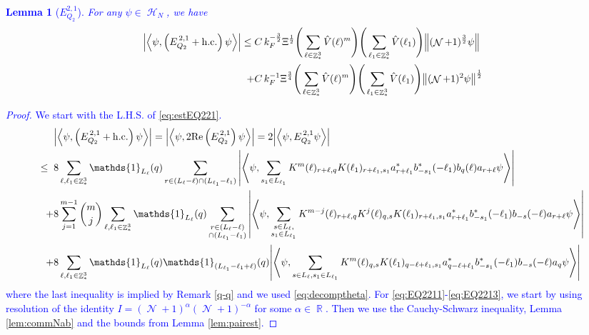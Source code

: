 \documentclass[sn-mathphys, Numbered ,a4paper]{sn-jnl}%
\DeclareMathOperator{\R}{\mathbb{R}}
\DeclareMathOperator{\Z}{\mathbb{Z}}
\DeclareMathOperator{\HH}{\mathcal{H}}
\DeclareMathOperator{\NN}{\mathcal{N}}
\newcommand{\half}{\frac{1}{2}}
\newcommand{\eva}[1]{\left\langle #1 \right\rangle}
\theoremstyle{plain}
\newtheorem{lemma}[theorem]{Lemma}
\theoremstyle{definition}
\theoremstyle{remark}
\theoremstyle{plain}
\theoremstyle{definition}
\theoremstyle{remark}
\begin{document}
\textcolor{blue}{\begin{lemma}[$E_{Q_2}^{2,1}$]\label{lem:EQ221}
    For any $\psi \in \HH_N$, we have
    \begin{alignat}{2}
    	\abs{\eva{\psi,\left(E^{\,2,1}_{Q_2}+\mathrm{h.c.}\right) \psi }}
    	\leq \; &C\,  k_{F}^{-\frac{3}{2}} \Xi^\half \Bigg(\sum\limits_{\ell \in \Z^3_*} \hat{V}(\ell)^m\Bigg)\Bigg( \sum\limits_{\ell_1 \in \Z^3_*} \hat{V}(\ell_1) \Bigg) \norm { (\NN+1)^{\frac{3}{2}} \psi }\\
    	\;+ &C\, k_{F}^{-1}\Xi^{\frac{3}{4}} \Bigg(\sum\limits_{\ell \in \Z^3_*} \hat{V}(\ell)^m\Bigg) \Bigg(\sum\limits_{\ell_1 \in \Z^3_*} \hat{V}(\ell_1) \Bigg)  \norm{ (\NN+1)^2\psi}^\half\label{eq:estEQ221}
    \end{alignat}
\end{lemma}
\begin{proof}
 We start with the L.H.S. of \eqref{eq:estEQ221}.
 \begin{align}
 	&\abs{\eva{\psi,\left(E^{\,2,1}_{Q_2}+\mathrm{h.c.}\right) \psi }} = \abs{\eva{\psi,2\mathrm{Re}\left(E^{\,2,1}_{Q_2}\right) \psi }} = 2\abs{\eva{\psi, E^{\,2,1}_{Q_2} \psi }}\nonumber\\
 	\leq\;\;&8 \sum\limits_{\ell, \ell_1\in \Z^3_*} \mathds{1}_{L_{\ell}}(q) \sum\limits_{r\in (L_{\ell}-\ell) \cap (L_{\ell_1}-\ell_1)} \abs{\eva{\psi, \sum\limits_{ s_1\in L_{\ell_1} }  K^m(\ell )_{r+\ell,q}K(\ell_1)_{r+\ell_1,s_1}
 			a^*_{r+\ell_1} b^*_{-s_1}(-\ell_1)  b_{q}(\ell)a_{r+\ell} \psi}} \label{eq:EQ2211}\\
 	\;+&8 \sum\limits_{j=1}^{m-1} {{m}\choose j} \sum\limits_{\ell, \ell_1\in \Z^3_*}\mathds{1}_{L_{\ell}}(q) \sum\limits_{\substack{r\in (L_{\ell}-\ell) \\ \cap (L_{\ell_1}-\ell_1)}}  \abs{\eva{\psi, \sum\limits_{ \substack{s \in L_{\ell},\\s_1\in L_{\ell_1}} }   K^{m-j}(\ell)_{r+\ell,q} K^{j}(\ell)_{q,s} K(\ell_1)_{r+\ell_1,s_1} a^*_{r+\ell_1}  b^*_{-s_1}(-\ell_1) b_{-s}(-\ell) a_{r+\ell} \psi }} \label{eq:EQ2212}\\
 	\;+&8\sum\limits_{\ell, \ell_1\in \Z^3_*} \mathds{1}_{L_{\ell}}(q) \mathds{1}_{(L_{\ell_1}-\ell_1+\ell)}(q)  \abs{\eva{\psi, \sum\limits_{s \in L_{\ell},s_1\in L_{\ell_1}} K^m(\ell)_{q,s} K(\ell_1)_{q-\ell+\ell_1,s_1} a^*_{q-\ell+\ell_1} b^*_{-s_1}(-\ell_1) b_{-s}(-\ell) a_{q} \psi}} \label{eq:EQ2213}
 \end{align}
 where the last inequality is implied by Remark \ref{q-q} and we used \eqref{eq:decomptheta}.
 For \eqref{eq:EQ2211}-\eqref{eq:EQ2213}, we start by using resolution of the identity $I = (\NN+1)^{\alpha}(\NN+1)^{-\alpha}$ for some $\alpha \in \R$. Then we use the Cauchy-Schwarz inequality, Lemma \ref{lem:commNab} and the bounds from Lemma \ref{lem:pairest}.

\end{proof}}
\end{document}
